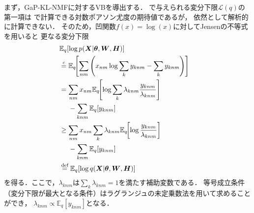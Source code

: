 まず，GaP-KL-NMFに対するVBを導出する．
で与えられる変分下限$\mathcal{L}(q)$の第一項は
で計算できる対数ポアソン尤度の期待値であるが，
依然として解析的に計算できない．
そのため，凹関数$f(x)=\log(x)$に対してJensenの不等式を用いると
更なる変分下限
\begin{align}
&
\mathbb{E}_{q}[\log p(\bm{X}|\bm\theta,\bm{W},\bm{H})]
\nonumber\\
&
\overset{c}{=} \mathbb{E}_{q}\!\!\left[\sum_{nm} \left(x_{nm} \log \sum_k y_{knm} - \sum_k y_{knm}\right)\right]
\nonumber\\
&
= \sum_{nm} x_{nm} \mathbb{E}_{q}\!\!\left[\log \sum_k \lambda_{knm} \frac{y_{knm}}{\lambda_{knm}}\right] 
&
\nonumber\\
& \ \ \ \
- \sum_{knm} \mathbb{E}_{q}\!\left[y_{knm}\right]
\nonumber\\
%
&
\ge \sum_{nm} x_{nm} \sum_k \lambda_{knm} \mathbb{E}_{q}\!\!\left[\log \frac{y_{knm}}{\lambda_{knm}}\right] 
&
\nonumber\\
& \ \ \ \ 
- \sum_{knm} \mathbb{E}_{q}\!\left[y_{knm}\right]
\nonumber\\
&\overset{\mbox{\scriptsize def}}{=} 
\mathbb{E}_{q}[\log q(\bm{X}|\bm\theta,\bm{W},\bm{H})]
\label{eqn:lb2_kl}
\end{align}
を得る．ここで，$\lambda_{knm}$は$\sum_k \lambda_{knm} = 1$を満たす補助変数である．
等号成立条件（変分下限が最大となる条件）はラグランジュの未定乗数法を用いて求めることができ，
$\lambda_{knm} \propto \mathbb{E}_{q}[y_{knm}]$となる．

